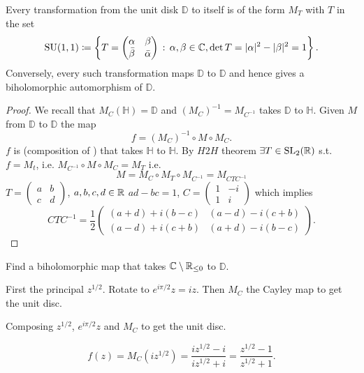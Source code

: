 \documentclass[10pt, a4paper]{article}
\begin{document}
\begin{proposition}[D$2$D]
    Every \mobius transformation from the unit disk $\mathbb{D}$ to itself is of the form $M_T$ with $T$ in the set
    \[
    \mathrm{SU}(1, 1) \coloneqq \left\{T = \begin{pmatrix}
        \alpha & \beta \\ \bar{\beta} & \bar{\alpha}
    \end{pmatrix}\,:\, \alpha, \beta \in \mathbb{C}, \det{T} = |\alpha| ^ 2 - |\beta| ^ 2 = 1\right\}.
    \]
    Conversely,
    every such \mobius transformation maps $\mathbb{D}$ to $\mathbb{D}$ and hence gives a biholomorphic automorphism of $\mathbb{D}$.

    \begin{proof}
        We recall that $M_C(\mathbb{H}) = \mathbb{D}$ and $(M_C) ^ {-1} = M_{C ^ {-1}}$ takes $\mathbb{D}$ to $\mathbb{H}$.
        Given \mobius $M$ from $\mathbb{D}$ to $\mathbb{D}$ the map
        \[
        f = (M_C) ^ {-1} \circ M \circ M_C.
        \]
        $f$ is \mobius
        (composition of \mobius\!\!)
        that takes $\mathbb{H}$ to $\mathbb{H}$.
        By $H2H$ theorem $\exists T \in \mathrm{SL}_2(\mathbb{R})$ s.t. $f = M_t$,
        i.e. $M_{C ^ {-1}} \circ M \circ M_C = M_T$ i.e.
        \[
        M = M_C \circ M_T \circ M_{C ^ {-1}} = M_{CTC ^ {-1}}
        \]
        $T = \begin{pmatrix}
            a & b \\ c & d
        \end{pmatrix}$,
        $a, b, c, d \in \mathbb{R}$ $ad - bc = 1$,
        $C = \begin{pmatrix}
            1 & -i \\ 1 & i
        \end{pmatrix}$
        which implies
        \[
        CTC ^ {-1} = \frac{1}{2}\begin{pmatrix}
            (a + d) + i(b - c) & (a - d) - i(c + b) \\ (a - d) + i(c + b) & (a + d) - i(b - c)
        \end{pmatrix}.
        \]
    \end{proof}
\end{proposition}

\begin{example}
    Find a biholomorphic map that takes $\mathbb{C} \setminus \mathbb{R}_{\leq 0}$ to $\mathbb{D}$.

    \begin{solution}
        First the principal $z ^ {1 / 2}$.
        Rotate to $e ^ {i\pi / 2}z = iz$.
        Then $M_C$ the Cayley map to get the unit disc.

        Composing $z ^ {1 / 2}$,
        $e ^ {i\pi / 2}z$ and $M_C$ to get the unit disc.

        \[
        f(z) = M_C(iz ^ {1 / 2}) = \frac{iz ^ {1 / 2} - i}{iz ^ {1 / 2} + i} = \frac{z ^ {1 / 2} - 1}{z ^ {1 / 2} + 1}.
        \]
    \end{solution}
\end{example}
\end{document}
